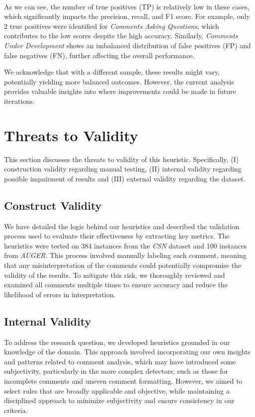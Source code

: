 \noindent \\ As we can see, the number of true positives (TP) is relatively low in these cases, which significantly impacts the precision, recall, and F1 score. For example, only 2 true positives were identified for \textit{Comments Asking Questions}, which contributes to the low scores despite the high accuracy. Similarly, \textit{Comments Under Development} shows an imbalanced distribution of false positives (FP) and false negatives (FN), further affecting the overall performance.

\noindent We acknowledge that with a different sample, these results might vary, potentially yielding more balanced outcomes. However, the current analysis provides valuable insights into where improvements could be made in future iterations.

\section{Threats to Validity}
This section discusses the threats to validity of this heuristic. Specifically, (I) construction validity regarding manual testing, (II) internal validity regarding possible impairment of results and (III) external validity regarding the dataset.

\subsection{Construct Validity}
We have detailed the logic behind our heuristics and described the validation process used to evaluate their effectiveness by extracting key metrics. The heuristics were tested on 384 instances from the \textit{CSN} dataset and 100 instances from \textit{AUGER}. This process involved manually labeling each comment, meaning that any misinterpretation of the comments could potentially compromise the validity of the results. To mitigate this risk, we thoroughly reviewed and examined all comments multiple times to ensure accuracy and reduce the likelihood of errors in interpretation.

\subsection{Internal Validity}
To address the research question, we developed heuristics grounded in our knowledge of the domain. This approach involved incorporating our own insights and patterns related to comment analysis, which may have introduced some subjectivity, particularly in the more complex detectors, such as those for incomplete comments and uneven comment formatting. However, we aimed to select rules that are broadly applicable and objective, while maintaining a disciplined approach to minimize subjectivity and ensure consistency in our criteria.

